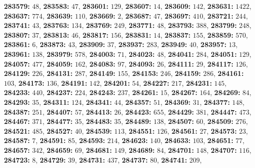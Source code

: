 \textsf{\bfseries 283579:} $48$, \textsf{\bfseries 283583:} $47$, \textsf{\bfseries 283601:} $129$, \textsf{\bfseries 283607:} $14$, \textsf{\bfseries 283609:} $142$, \textsf{\bfseries 283631:} $1422$, \textsf{\bfseries 283637:} $774$, \textsf{\bfseries 283639:} $110$, \textsf{\bfseries 283669:} $2$, \textsf{\bfseries 283687:} $47$, \textsf{\bfseries 283697:} $410$, \textsf{\bfseries 283721:} $244$, \textsf{\bfseries 283741:} $43$, \textsf{\bfseries 283763:} $134$, \textsf{\bfseries 283769:} $249$, \textsf{\bfseries 283771:} $48$, \textsf{\bfseries 283793:} $388$, \textsf{\bfseries 283799:} $248$, \textsf{\bfseries 283807:} $37$, \textsf{\bfseries 283813:} $46$, \textsf{\bfseries 283817:} $156$, \textsf{\bfseries 283831:} $14$, \textsf{\bfseries 283837:} $155$, \textsf{\bfseries 283859:} $570$, \textsf{\bfseries 283861:} $6$, \textsf{\bfseries 283873:} $43$, \textsf{\bfseries 283909:} $37$, \textsf{\bfseries 283937:} $283$, \textsf{\bfseries 283949:} $40$, \textsf{\bfseries 283957:} $13$, \textsf{\bfseries 283961:} $138$, \textsf{\bfseries 283979:} $578$, \textsf{\bfseries 284003:} $71$, \textsf{\bfseries 284023:} $48$, \textsf{\bfseries 284041:} $284$, \textsf{\bfseries 284051:} $129$, \textsf{\bfseries 284057:} $477$, \textsf{\bfseries 284059:} $162$, \textsf{\bfseries 284083:} $97$, \textsf{\bfseries 284093:} $26$, \textsf{\bfseries 284111:} $29$, \textsf{\bfseries 284117:} $126$, \textsf{\bfseries 284129:} $226$, \textsf{\bfseries 284131:} $287$, \textsf{\bfseries 284149:} $155$, \textsf{\bfseries 284153:} $246$, \textsf{\bfseries 284159:} $286$, \textsf{\bfseries 284161:} $103$, \textsf{\bfseries 284173:} $136$, \textsf{\bfseries 284191:} $142$, \textsf{\bfseries 284201:} $54$, \textsf{\bfseries 284227:} $217$, \textsf{\bfseries 284231:} $145$, \textsf{\bfseries 284233:} $440$, \textsf{\bfseries 284237:} $224$, \textsf{\bfseries 284243:} $237$, \textsf{\bfseries 284261:} $15$, \textsf{\bfseries 284267:} $164$, \textsf{\bfseries 284269:} $84$, \textsf{\bfseries 284293:} $35$, \textsf{\bfseries 284311:} $124$, \textsf{\bfseries 284341:} $44$, \textsf{\bfseries 284357:} $51$, \textsf{\bfseries 284369:} $31$, \textsf{\bfseries 284377:} $148$, \textsf{\bfseries 284387:} $251$, \textsf{\bfseries 284407:} $57$, \textsf{\bfseries 284413:} $26$, \textsf{\bfseries 284423:} $655$, \textsf{\bfseries 284429:} $381$, \textsf{\bfseries 284447:} $473$, \textsf{\bfseries 284467:} $371$, \textsf{\bfseries 284477:} $35$, \textsf{\bfseries 284483:} $35$, \textsf{\bfseries 284489:} $138$, \textsf{\bfseries 284507:} $60$, \textsf{\bfseries 284509:} $276$, \textsf{\bfseries 284521:} $485$, \textsf{\bfseries 284527:} $40$, \textsf{\bfseries 284539:} $113$, \textsf{\bfseries 284551:} $126$, \textsf{\bfseries 284561:} $27$, \textsf{\bfseries 284573:} $23$, \textsf{\bfseries 284587:} $7$, \textsf{\bfseries 284591:} $85$, \textsf{\bfseries 284593:} $214$, \textsf{\bfseries 284623:} $140$, \textsf{\bfseries 284633:} $103$, \textsf{\bfseries 284651:} $77$, \textsf{\bfseries 284657:} $342$, \textsf{\bfseries 284659:} $69$, \textsf{\bfseries 284681:} $149$, \textsf{\bfseries 284689:} $84$, \textsf{\bfseries 284701:} $148$, \textsf{\bfseries 284707:} $116$, \textsf{\bfseries 284723:} $8$, \textsf{\bfseries 284729:} $39$, \textsf{\bfseries 284731:} $437$, \textsf{\bfseries 284737:} $80$, \textsf{\bfseries 284741:} $209$, 

